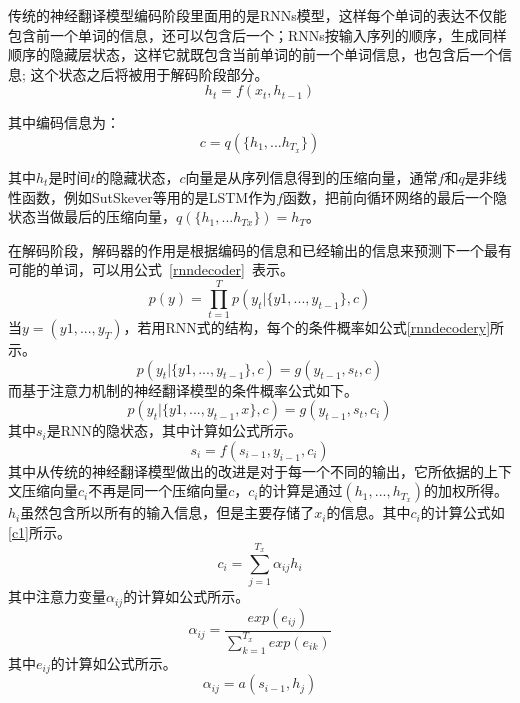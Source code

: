 传统的神经翻译模型编码阶段里面用的是RNNs模型，这样每个单词的表达不仅能包含前一个单词的信息，还可以包含后一个；RNNs按输入序列的顺序，生成同样顺序的隐藏层状态，这样它就既包含当前单词的前一个单词信息，也包含后一个信息; 这个状态之后将被用于解码阶段部分。
\begin{equation}\label{lstm_f} h_t = f(x_t,h_{t-1}) \end{equation}

其中编码信息为：
\begin{equation}\label{lstm_f} c = q(\lbrace h_1,...h_{T_x} \rbrace ) \end{equation}

其中$h_t$是时间$t$的隐藏状态，$c$向量是从序列信息得到的压缩向量，通常$f$和$q$是非线性函数，例如SutSkever等用的是LSTM作为$f$函数，把前向循环网络的最后一个隐状态当做最后的压缩向量，$q(\lbrace h_1,...h_{Tx} \rbrace )=h_T$。

在解码阶段，解码器的作用是根据编码的信息和已经输出的信息来预测下一个最有可能的单词，可以用公式~\ref{rnndecoder}~表示。
\begin{equation}\label{rnndecoder} p(y) = \prod_{t=1}^{T} p(y_t|\lbrace y1,...,y_{t-1} \rbrace , c) \end{equation}
当$y=(y1,...,y_{T})$，若用RNN式的结构，每个的条件概率如公式\ref{rnndecodery}所示。
\begin{equation}\label{rnndecodery} p(y_t|\lbrace y1,...,y_{t-1} \rbrace , c) = g(y_{t-1},s_t, c)\end{equation}
而基于注意力机制的神经翻译模型的条件概率公式如下。
\begin{equation}\label{} p(y_t|\lbrace y1,...,y_{t-1},x \rbrace,c) = g(y_{t-1},s_t,c_i)\end{equation}
其中$s_i$是RNN的隐状态，其中计算如公式所示。
\begin{equation}\label{} s_i = f(s_{i-1},y_{i-1}, c_i)\end{equation}
其中从传统的神经翻译模型做出的改进是对于每一个不同的输出，它所依据的上下文压缩向量$c_i$不再是同一个压缩向量$c$，$c_i$的计算是通过$(h_1,...,h_{T_x})$的加权所得。$h_i$虽然包含所以所有的输入信息，但是主要存储了$x_i$的信息。其中$c_i$的计算公式如\ref{c1}所示。
\begin{equation}\label{c1} c_i = \sum_{j=1}^{T_x} \alpha_{ij}h_i\end{equation}
其中注意力变量$\alpha_{ij}$的计算如公式所示。
\begin{equation}\label{alpha} \alpha_{ij} = \frac{exp(e_{ij})}{\sum_{k=1}^{T_x}exp(e_{ik})}\end{equation}
其中$e_{ij}$的计算如公式所示。
\begin{equation}\label{eij} \alpha_{ij} = a(s_{i-1},h_j)\end{equation}

